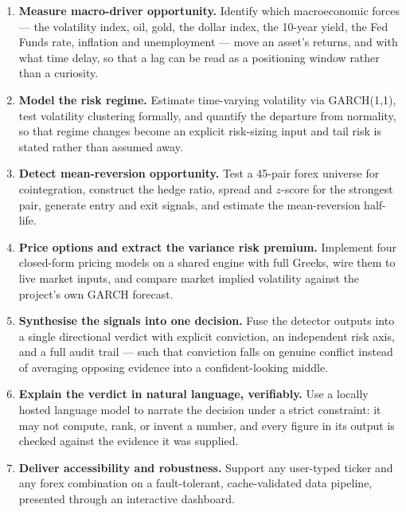 \documentclass[11pt,a4paper]{article}
\begin{document}
\begin{enumerate}
\item \textbf{Measure macro-driver opportunity.} Identify which macroeconomic forces ---
the volatility index, oil, gold, the dollar index, the 10-year yield, the Fed Funds rate,
inflation and unemployment --- move an asset's returns, and with what time delay, so that
a lag can be read as a positioning window rather than a curiosity.

\item \textbf{Model the risk regime.} Estimate time-varying volatility via GARCH(1,1),
test volatility clustering formally, and quantify the departure from normality, so that
regime changes become an explicit risk-sizing input and tail risk is stated rather than
assumed away.

\item \textbf{Detect mean-reversion opportunity.} Test a 45-pair forex universe for
cointegration, construct the hedge ratio, spread and $z$-score for the strongest pair,
generate entry and exit signals, and estimate the mean-reversion half-life.

\item \textbf{Price options and extract the variance risk premium.} Implement four
closed-form pricing models on a shared engine with full Greeks, wire them to live market
inputs, and compare market implied volatility against the project's own GARCH forecast.

\item \textbf{Synthesise the signals into one decision.} Fuse the detector outputs into a
single directional verdict with explicit conviction, an independent risk axis, and a full
audit trail --- such that conviction falls on genuine conflict instead of averaging
opposing evidence into a confident-looking middle.

\item \textbf{Explain the verdict in natural language, verifiably.} Use a locally hosted
language model to narrate the decision under a strict constraint: it may not compute,
rank, or invent a number, and every figure in its output is checked against the evidence it
was supplied.

\item \textbf{Deliver accessibility and robustness.} Support any user-typed ticker and any
forex combination on a fault-tolerant, cache-validated data pipeline, presented through an
interactive dashboard.
\end{enumerate}
\end{document}
